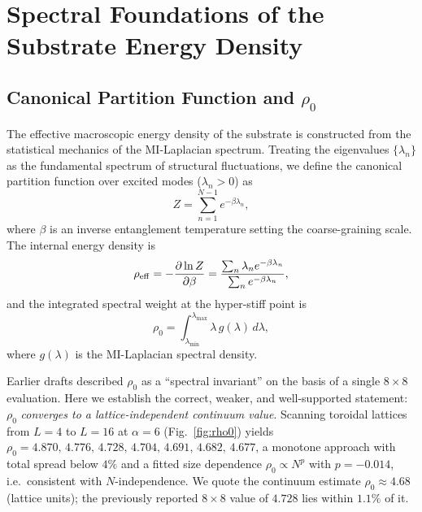 \documentclass[reprint,superscriptaddress,amsmath,amssymb,aps,prd,showkeys,nofootinbib]{revtex4-2}
\begin{document}
\section{Spectral Foundations of the Substrate Energy Density}
\label{sec:spectral}

\subsection{Canonical Partition Function and $\rho_0$}

The effective macroscopic energy density of the substrate is constructed from the
statistical mechanics of the MI-Laplacian spectrum. Treating the eigenvalues
$\{\lambda_n\}$ as the fundamental spectrum of structural fluctuations, we define the
canonical partition function over excited modes ($\lambda_n>0$) as
\begin{equation}
Z = \sum_{n=1}^{N-1} e^{-\beta\lambda_n},
\end{equation}
where $\beta$ is an inverse entanglement temperature setting the coarse-graining scale.
The internal energy density is
\begin{equation}
\rho_{\rm eff} = -\frac{\partial\ln Z}{\partial\beta}
= \frac{\sum_n \lambda_n e^{-\beta\lambda_n}}{\sum_n e^{-\beta\lambda_n}},
\end{equation}
and the integrated spectral weight at the hyper-stiff point is
\begin{equation}
\rho_0 = \int_{\lambda_{\min}}^{\lambda_{\max}} \lambda\,g(\lambda)\,d\lambda,
\label{eq:rho0}
\end{equation}
where $g(\lambda)$ is the MI-Laplacian spectral density.

Earlier drafts described $\rho_0$ as a ``spectral invariant'' on the basis of a single
$8\times8$ evaluation. Here we establish the correct, weaker, and well-supported statement:
$\rho_0$ \emph{converges to a lattice-independent continuum value}. Scanning toroidal
lattices from $L=4$ to $L=16$ at $\alpha=6$ (Fig.~\ref{fig:rho0}) yields
$\rho_0 = 4.870,\,4.776,\,4.728,\,4.704,\,4.691,\,4.682,\,4.677$, a monotone approach with
total spread below $4\%$ and a fitted size dependence $\rho_0\propto N^{p}$ with
$p=-0.014$, i.e.\ consistent with $N$-independence. We quote the continuum estimate
$\rho_0 \approx 4.68$ (lattice units); the previously reported $8\times8$ value of $4.728$
lies within $1.1\%$ of it.
\end{document}
